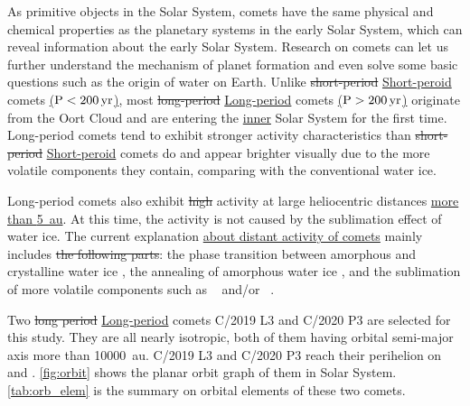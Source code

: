 As primitive objects in the Solar System, comets have the same physical and chemical properties as the planetary systems in the early Solar System, which can reveal information about the early Solar System. Research on comets can let us further understand the mechanism of planet formation and even solve some basic questions such as the origin of water on Earth. Unlike \st{short-period} \ul{Short-peroid} comets \ul{($\rm P<\SI{200}{yr}$)}, most \st{long-period} \ul{Long-period} comets \ul{($\rm P>\SI{200}{yr}$)} originate from the Oort Cloud and are entering the \ul{inner} Solar System for the first time. Long-period comets tend to exhibit stronger activity characteristics than \st{short-period} \ul{Short-peroid} comets do and appear brighter visually due to the more volatile components they contain, comparing with the conventional water ice. 

Long-period comets also exhibit \st{high} activity at large heliocentric distances \ul{more than {\SI{5}{\astronomicalunit}}}. At this time, the activity is not caused by the sublimation effect of water ice. The current explanation \ul{about distant activity of comets} mainly includes \st{the following parts}: the phase transition between amorphous and crystalline water ice \citep{prialnik_crystallization_1992, capria_c1995_2002}, the annealing of amorphous water ice \citep{meech_activity_2009}, and the sublimation of more volatile components such as ~\citep{ootsubo_akari_2012} and/or ~\citep{jewitt_distant_2019}. 

Two \st{long period} \ul{Long-period} comets C/2019 L3 and C/2020 P3 are selected for this study. They are all nearly isotropic, both of them having orbital semi-major axis more than {\SI{10000}{\astronomicalunit}}. C/2019 L3 and C/2020 P3 reach their perihelion on  and . \autoref{fig:orbit} shows the planar orbit graph of them in Solar System. \autoref{tab:orb_elem} is the summary on orbital elements of these two comets. 

